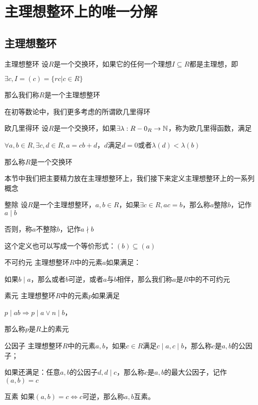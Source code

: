 \documentclass[12pt, a4paper, oneside, UTF8]{ctexbook}
\begin{document}
	\section{主理想整环上的唯一分解}
		\subsection{主理想整环}
			\begin{defn}{主理想整环}{}
				设$R$是一个交换环，如果它的任何一个理想$I \subseteq R$都是主理想，即
				
				$\exists c,I = (c) = \{rc | c \in R\}$
				
				那么我们称$R$是一个主理想整环
			\end{defn}
			在初等数论中，我们更多考虑的所谓欧几里得环
			\begin{defn}{欧几里得环}{}
				设$R$是一个交换环，如果$\exists \lambda : R-{0_R} \rightarrow \mathbb{N}$，称为欧几里得函数，满足
				
				$\forall a,b \in R,\exists c,d \in R,a = cb+d$，$d$满足$d=0$或者$\lambda (d) < \lambda (b)$
				
				那么称$R$是一个交换环
			\end{defn}
			本节中我们把主要精力放在主理想整环上，我们接下来定义主理想整环上的一系列概念
			\begin{defn}{整除}{}
				设$R$是一个主理想整环，$a,b\in R$，如果$\exists c \in R,ac = b$，那么称$a$整除$b$，记作$a \mid b$
				
				否则，称$a$不整除$b$，记作$a \nmid b$
			\end{defn}
			这个定义也可以写成一个等价形式：$(b) \subseteq (a)$
			\begin{defn}{不可约元}{}
				主理想整环$R$中的元素$a$如果满足：
				
				如果$b \mid a$，那么或者$b$可逆，或者$a$与$b$相伴，那么我们称$a$是$R$中的不可约元
			\end{defn}
			\begin{defn}{素元}{}
				主理想整环$R$中的元素$p$如果满足
				
				$p \mid ab \Rightarrow p \mid a \vee n \mid b$，
				
				那么称$p$是$R$上的素元
			\end{defn}
			\begin{defn}{公因子}{}
				主理想整环$R$中的元素$a,b$，如果$c \in R$满足$c \mid a,c\mid b$，那么称$c$是$a,b$的公因子；
				
				如果还满足：任意$a,b$的公因子$d,d\mid c$，那么称$c$是$a,b$的最大公因子，记作$(a,b)=c$
			\end{defn}
			\begin{defn}{互素}{}
				如果$(a,b)=c \Leftrightarrow c \text{可逆}$，那么称$a,b$互素。
			\end{defn}
\end{document}
